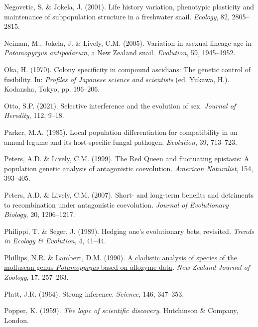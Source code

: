 \documentclass[
  american,
  letterpaper,
]{book}
\newlength{\cslhangindent}
\newenvironment{CSLReferences}[2] %
 {\begin{list}{}{%
  \setlength{\itemindent}{0pt}
  \setlength{\leftmargin}{0pt}
  \setlength{\parsep}{0pt}
  \ifodd #1
   \setlength{\leftmargin}{\cslhangindent}
   \setlength{\itemindent}{-1\cslhangindent}
  \fi
  \setlength{\itemsep}{#2\baselineskip}}}
 {\end{list}}
\begin{document}
\begin{CSLReferences}{1}{0}
Negovetic, S. \& Jokela, J. (2001). Life history variation, phenotypic
plasticity and maintenance of subpopulation structure in a freshwater
snail. \emph{Ecology}, 82, 2805--2815.

Neiman, M., Jokela, J. \& Lively, C.M. (2005). Variation in asexual
lineage age in \emph{{P}otamopyrgus antipodarum}, a {New Zealand} snail.
\emph{Evolution}, 59, 1945--1952.

Oka, H. (1970). Colony specificity in compound ascidians: The genetic
control of fusibility. In: \emph{Profiles of {Japanese} science and
scientists} (ed. Yukawa, H.). Kodansha, Tokyo, pp. 196--206.

Otto, S.P. (2021). Selective interference and the evolution of sex.
\emph{Journal of Heredity}, 112, 9--18.

Parker, M.A. (1985). Local population differentiation for compatibility
in an annual legume and its host-specific fungal pathogen.
\emph{Evolution}, 39, 713--723.

Peters, A.D. \& Lively, C.M. (1999). The {Red Queen} and fluctuating
epistasis: A population genetic analysis of antagonistic coevolution.
\emph{American Naturalist}, 154, 393--405.

Peters, A.D. \& Lively, C.M. (2007). Short- and long-term benefits and
detriments to recombination under antagonistic coevolution.
\emph{Journal of Evolutionary Biology}, 20, 1206--1217.

Philippi, T. \& Seger, J. (1989). Hedging one's evolutionary bets,
revisited. \emph{Trends in Ecology \& Evolution}, 4, 41--44.

Phillips, N.R. \& Lambert, D.M. (1990).
\href{https://doi.org/10.1080/03014223.1990.10422600}{A cladistic
analysis of species of the molluscan genus \emph{{P}otamopyrgus} based
on allozyme data}. \emph{New Zealand Journal of Zoology}, 17, 257--263.

Platt, J.R. (1964). Strong inference. \emph{Science}, 146, 347--353.

Popper, K. (1959). \emph{The logic of scientific discovery}. Hutchinson
\& Company, London.


\end{CSLReferences}
\end{document}
